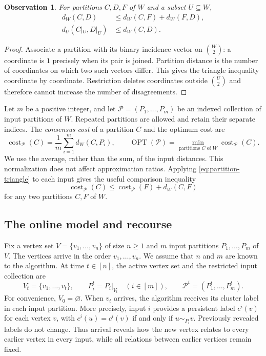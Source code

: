 \documentclass[11pt]{article}
\newtheorem{observation}[theorem]{Observation}
\theoremstyle{definition}
\theoremstyle{remark}
\newcommand{\Pp}{\mathcal{P}}
\newcommand{\OPT}{\operatorname{OPT}}
\newcommand{\cost}{\operatorname{cost}}
\newcommand{\1}{\mathbf{1}}
\begin{document}
\begin{observation}\label{obs:partition-metric}
For partitions $C,D,F$ of $W$ and a subset $U\subseteq W$,
\begin{align}
  d_W(C,D)&\le d_W(C,F)+d_W(F,D), \label{eq:partition-triangle}\\
  d_U(C|_U,D|_U)&\le d_W(C,D). \label{eq:restriction-distance}
\end{align}
\end{observation}
\begin{proof}
Associate a partition with its binary incidence vector on $\binom{W}{2}$:
a coordinate is $1$ precisely when its pair is joined. Partition distance
is the number of coordinates on which two such vectors differ. This gives
the triangle inequality coordinate by coordinate. Restriction deletes
coordinates outside $\binom{U}{2}$ and therefore cannot increase the
number of disagreements.
\end{proof}

Let $m$ be a positive integer, and let
$\Pp=(P_1,\ldots,P_m)$ be an indexed collection of input partitions of $W$.
Repeated partitions are allowed and retain their separate indices.
The \emph{consensus cost} of a partition $C$ and the optimum cost are
\begin{equation}\label{eq:consensus-objective}
  \cost_{\Pp}(C)=\frac1m\sum_{i=1}^m d_W(C,P_i),
  \qquad
  \OPT(\Pp)=\min_{\text{partitions }C\text{ of }W}\cost_{\Pp}(C).
\end{equation}
We use the average, rather than the sum, of the input distances. This
normalization does not affect approximation ratios.
Applying \eqref{eq:partition-triangle} to each input gives the useful
comparison inequality
\begin{equation}\label{eq:cost-comparison}
  \cost_{\Pp}(C)\le \cost_{\Pp}(F)+d_W(C,F)
\end{equation}
for any two partitions $C,F$ of $W$.

\subsection{The online model and recourse}\label{subsec:online-model}

Fix a vertex set $V=\{v_1,\ldots,v_n\}$ of size $n\ge1$ and $m$
input partitions $P_1,\ldots,P_m$ of $V$.
The vertices arrive in the order $v_1,\ldots,v_n$.
We assume that $n$ and $m$ are known to the algorithm.
At time $t\in[n]$, the active vertex set and the restricted input collection
are
\[
  V_t=\{v_1,\ldots,v_t\},\qquad
  P_i^t=P_i|_{V_t}\quad(i\in[m]),\qquad
  \Pp^t=(P_1^t,\ldots,P_m^t).
\]
For convenience, $V_0=\varnothing$.
When $v_t$ arrives, the algorithm receives its cluster label in each
input partition. More precisely, input $i$ provides a persistent label
$c^i(v)$ for each vertex $v$, with
$c^i(u)=c^i(v)$ if and only if $u\sim_{P_i}v$.
Previously revealed labels do not change.
Thus arrival reveals how the new vertex relates to every earlier vertex
in every input, while all relations between earlier vertices remain fixed.
\end{document}
